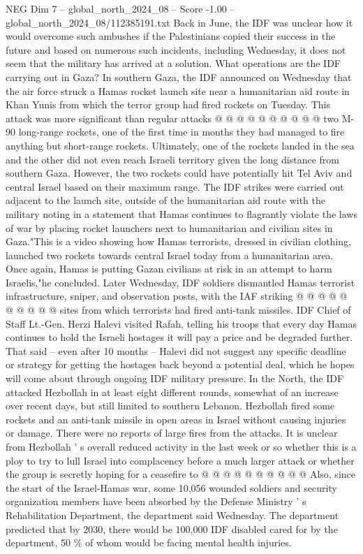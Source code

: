 \begin{textsample}{NEG Dim 7 – global\_north\_2024\_08 – Score -1.00 – global\_north\_2024\_08/112385191.txt}
Back in June, the IDF was unclear how it would overcome such ambushes if the Palestinians copied their success in the future and based on numerous such incidents, including Wednesday, it does not seem that the military has arrived at a solution.
What operations are the IDF carrying out in Gaza?
In southern Gaza, the IDF announced on Wednesday that the air force struck a Hamas rocket launch site near a humanitarian aid route in Khan Yunis from which the terror group had fired rockets on Tuesday.
This attack was more significant than regular attacks @ @ @ @ @ @ @ @ @ @ two M-90 long-range rockets, one of the first time in months they had managed to fire anything but short-range rockets.
Ultimately, one of the rockets landed in the sea and the other did not even reach Israeli territory given the long distance from southern Gaza.
However, the two rockets could have potentially hit Tel Aviv and central Israel based on their maximum range.
The IDF strikes were carried out adjacent to the launch site, outside of the humanitarian aid route with the military noting in a statement that Hamas continues to flagrantly violate the laws of war by placing rocket launchers next to humanitarian and civilian sites in Gaza."This is a video showing how Hamas terrorists, dressed in civilian clothing, launched two rockets towards central Israel today from a humanitarian area.
Once again, Hamas is putting Gazan civilians at risk in an attempt to harm Israelis,"he concluded.
Later Wednesday, IDF soldiers dismantled Hamas terrorist infrastructure, sniper, and observation posts, with the IAF striking @ @ @ @ @ @ @ @ @ @ sites from which terrorists had fired anti-tank missiles.
IDF Chief of Staff Lt.-Gen.
Herzi Halevi visited Rafah, telling his troops that every day Hamas continues to hold the Israeli hostages it will pay a price and be degraded further.
That said -- even after 10 months -- Halevi did not suggest any specific deadline or strategy for getting the hostages back beyond a potential deal, which he hopes will come about through ongoing IDF military pressure.
In the North, the IDF attacked Hezbollah in at least eight different rounds, somewhat of an increase over recent days, but still limited to southern Lebanon.
Hezbollah fired some rockets and an anti-tank missile in open areas in Israel without causing injuries or damage.
There were no reports of large fires from the attacks.
It is unclear from Hezbollah ' s overall reduced activity in the last week or so whether this is a ploy to try to lull Israel into complacency before a much larger attack or whether the group is secretly hoping for a ceasefire to @ @ @ @ @ @ @ @ @ @ Also, since the start of the Israel-Hamas war, some 10,056 wounded soldiers and security organization members have been absorbed by the Defense Ministry ' s Rehabilitation Department, the department said Wednesday.
The department predicted that by 2030, there would be 100,000 IDF disabled cared for by the department, 50 \% of whom would be facing mental health injuries.

\end{textsample}
